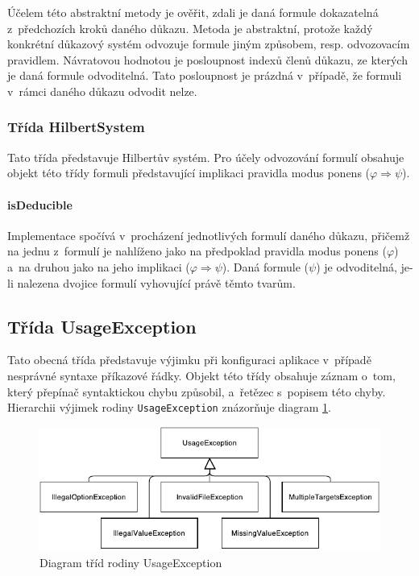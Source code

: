 \documentclass[thesis=B,czech,hidelinks]{thesis}[2012/06/26]
\begin{document}
Účelem této abstraktní metody je ověřit, zdali je daná formule dokazatelná z~předchozích kroků daného důkazu. Metoda je abstraktní, protože každý konkrétní důkazový systém odvozuje formule jiným způsobem, resp. odvozovacím pravidlem. Návratovou hodnotou je posloupnost indexů členů důkazu, ze kterých je daná formule odvoditelná. Tato posloupnost je prázdná v~případě, že formuli v~rámci daného důkazu odvodit nelze.

\subsubsection{Třída HilbertSystem}

Tato třída představuje Hilbertův systém. Pro účely odvozování formulí obsahuje objekt této třídy formuli představující implikaci pravidla modus ponens ($\varphi \Rightarrow \psi$).

\paragraph{isDeducible}

Implementace spočívá v~procházení jednotlivých formulí daného důkazu, přičemž na jednu z~formulí je nahlíženo jako na předpoklad pravidla modus ponens ($\varphi$) a~na druhou jako na jeho implikaci ($\varphi \Rightarrow \psi$). Daná formule ($\psi$) je odvoditelná, je-li nalezena dvojice formulí vyhovující právě těmto tvarům.

\begin{algorithm}
{
	{
			{
				\;
			}
	}
}
\end{algorithm}

\subsection{Třída UsageException}

Tato obecná třída představuje výjimku při konfiguraci aplikace v~případě nesprávné syntaxe příkazové řádky. Objekt této třídy obsahuje záznam o~tom, který přepínač syntaktickou chybu způsobil, a~řetězec s~popisem této chyby. Hierarchii výjimek rodiny \texttt{UsageException} znázorňuje diagram \ref{fig:usage_exception}.

\begin{figure}
\centering
\caption{Diagram tříd rodiny UsageException}
\label{fig:usage_exception}
\includegraphics{diagrams/usage_exception}
\end{figure}
\end{document}
